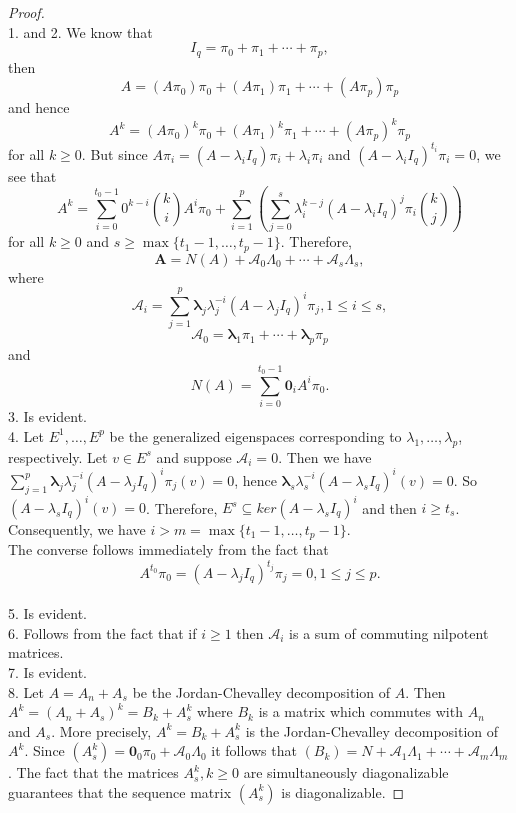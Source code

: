 \documentclass[12pt]{amsart}
\theoremstyle{definition}
\numberwithin{equation}{section}
\numberwithin{equation}{section}
\begin{document}
\begin{proof}~
\\1. and 2. We know that $$I_{q}=\pi_{0}+\pi_{1}+\cdots+\pi_{p},$$ then $$A=(A\pi_{0})\pi_{0}+(A\pi_{1})\pi_{1}+\cdots+(A\pi_{p})\pi_{p}$$ and hence $$A^{k}=(A\pi_{0})^{k}\pi_{0}+(A\pi_{1})^{k}\pi_{1}+\cdots+(A\pi_{p})^{k}\pi_{p}$$ for all $k\geqslant 0$. But since $A\pi_{i}=(A-\lambda_{i}I_{q})\pi_{i}+\lambda_{i}\pi_{i}$ and $(A-\lambda_{i}I_{q})^{t_{i}}\pi_{i}=0$, we see that $$A^{k}=\sum_{i=0}^{t_{0}-1}0^{k-i}\binom{k}{i}A^{i}\pi_{0}+\sum_{i=1}^{p}(\sum_{j=0}^{s}\lambda_{i}^{k-j}(A-\lambda_{i}I_{q})^{j}\pi_{i}\binom{k}{j})$$
for all $k\geqslant 0$ and $s\geqslant \max\{t_{1}-1,\ldots,t_{p}-1\}$.
Therefore, $$\pmb{A}= N(A) + \mathcal{A}_{0}\Lambda_{0} + \cdots + \mathcal{A}_{s}\Lambda_{s},$$ where $$\mathcal{A}_{i}=\displaystyle\sum_{j=1}^{p}\pmb{\lambda}_{j}\lambda_{j}^{-i}(A-\lambda_{j}I_{q})^{i}\pi_{j}, 1\leqslant i\leqslant s,$$
$$\mathcal{A}_{0}=\pmb{\lambda}_{1}\pi_{1}+\cdots+\pmb{\lambda}_{p}\pi_{p}$$ and $$N(A)=\displaystyle\sum_{i=0}^{t_{0}-1}\pmb{0}_{i}A^{i}\pi_{0}.$$
3. Is evident.
\\4. Let $E^{1},\ldots,E^{p}$ be the generalized eigenspaces corresponding to $\lambda_{1},\ldots,\lambda_{p}$, respectively. Let $v\in E^{s}$ and suppose $\mathcal{A}_{i}=0$. Then we have $\displaystyle\sum_{j=1}^{p}\pmb{\lambda}_{j}\lambda_{j}^{-i}(A-\lambda_{j}I_{q})^{i}\pi_{j}(v)=0$, hence $\pmb{\lambda}_{s}\lambda_{s}^{-i}(A-\lambda_{s}I_{q})^{i}(v)=0$. So $(A-\lambda_{s}I_{q})^{i}(v)=0$. Therefore, $E^{s}\subseteq ker(A-\lambda_{s}I_{q})^{i}$ and then $i\geqslant t_{s}$. Consequently, we have $i> m=\max\{t_{1}-1,\ldots,t_{p}-1\}$.
\\The converse follows immediately from the fact that $$A^{t_{0}}\pi_{0}=(A-\lambda_{j}I_{q})^{t_{j}}\pi_{j}=0, 1\leqslant j\leqslant p.$$
\\5. Is evident.
\\6. Follows from the fact that if $i\geqslant 1$ then $\mathcal{A}_{i}$ is a sum of commuting nilpotent matrices.
\\7. Is evident.
\\8. Let $A=A_{n}+A_{s}$ be the Jordan-Chevalley decomposition of $A$. Then $A^{k}=(A_{n}+A_{s})^{k}=B_{k}+A^{k}_{s}$ where $B_{k}$ is a matrix which commutes with $A_{n}$ and $A_{s}$. More precisely, $A^{k}=B_{k}+A^{k}_{s}$ is the Jordan-Chevalley decomposition of $A^{k}$. Since $(A^{k}_{s})=\pmb{0}_{0}\pi_{0}+\mathcal{A}_{0}\Lambda_{0}$ it follows that $(B_{k})=N + \mathcal{A}_{1}\Lambda_{1} + \cdots + \mathcal{A}_{m}\Lambda_{m}$. The fact that the matrices $A_{s}^{k}, k\geqslant 0$ are simultaneously diagonalizable guarantees that the sequence matrix $(A_{s}^{k})$ is diagonalizable.
\end{proof}
\end{document}
